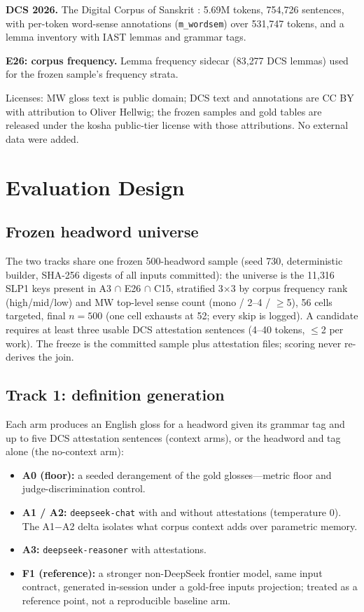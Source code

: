 \documentclass[11pt]{article}
\begin{document}
\textbf{DCS 2026.} The Digital Corpus of Sanskrit \cite{hellwig-dcs}: 5.69M tokens,
754{,}726 sentences, with per-token word-sense annotations (\texttt{m\_wordsem}) over
531{,}747 tokens, and a lemma inventory with IAST lemmas and grammar tags.

\textbf{E26: corpus frequency.} Lemma frequency sidecar (83{,}277 DCS lemmas) used for
the frozen sample's frequency strata.

Licenses: MW gloss text is public domain; DCS text and annotations are CC BY with
attribution to Oliver Hellwig; the frozen samples and gold tables are released under the
kosha public-tier license with those attributions. No external data were added.

\section{Evaluation Design}

\subsection{Frozen headword universe}

The two tracks share one frozen 500-headword sample (seed 730, deterministic builder,
SHA-256 digests of all inputs committed): the universe is the 11{,}316 SLP1 keys present
in A3 $\cap$ E26 $\cap$ C15, stratified 3$\times$3 by corpus frequency rank (high/mid/low)
and MW top-level sense count (mono / 2--4 / $\geq$5), 56 cells targeted, final $n=500$
(one cell exhausts at 52; every skip is logged). A candidate requires at least three
usable DCS attestation sentences (4--40 tokens, $\leq$2 per work). The freeze is the
committed sample plus attestation files; scoring never re-derives the join.

\subsection{Track 1: definition generation}

Each arm produces an English gloss for a headword given its grammar tag and up to five
DCS attestation sentences (context arms), or the headword and tag alone (the no-context
arm):

\begin{itemize}
\item \textbf{A0 (floor):} a seeded derangement of the gold glosses---metric floor and
judge-discrimination control.
\item \textbf{A1 / A2:} \texttt{deepseek-chat} \cite{deepseek-2025} with and without
attestations (temperature 0). The A1$-$A2 delta isolates what corpus context adds over
parametric memory.
\item \textbf{A3:} \texttt{deepseek-reasoner} with attestations.
\item \textbf{F1 (reference):} a stronger non-DeepSeek frontier model, same input
contract, generated in-session under a gold-free inputs projection; treated as a
reference point, not a reproducible baseline arm.
\end{itemize}
\end{document}

